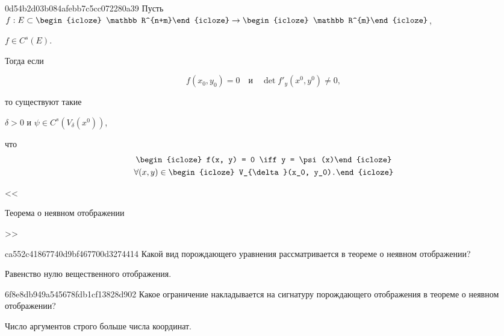\begin{note}{0d54b2d03b084afebb7c5cc072280a39}
    Пусть \({ f : E \subset \begin{icloze}{4}\mathbb R^{n+m}\end{icloze} \to \begin{icloze}{4}\mathbb R^{m}\end{icloze} }\), \begin{icloze}{5}\({ f \in C^{s}(E) }\).\end{icloze}
    Тогда если
    \begin{icloze}{1}
        \[
            f(x_{0}, y_{0}) = 0 \quad \text{и} \quad \det f'_{y}(x^{0}, y^{0}) \neq 0,
        \]
    \end{icloze}
    то существуют такие \begin{icloze}{2}\({ \delta > 0 }\) и \({ \psi \in C^{s}(V_{\delta}(x^0)) }\),\end{icloze} что
    \[
        \begin{gathered}
            \begin{icloze}{3}f(x, y) = 0 \iff y = \psi(x)\end{icloze} \\
            \forall (x, y) \in \begin{icloze}{6}V_{\delta}(x_0, y_0).\end{icloze}
        \end{gathered}
    \]

    \begin{center}
        \tiny
        <<\begin{icloze}{7}Теорема о неявном отображении\end{icloze}>>
    \end{center}
\end{note}

\begin{note}{ca552c41867740d9bf467700d3274414}
    Какой вид порождающего уравнения рассматривается в теореме о неявном отображении?

    \begin{cloze}{1}
        Равенство нулю вещественного отображения.
    \end{cloze}
\end{note}

\begin{note}{6f8e8db949a545678fdb1cf13828d902}
    Какое ограничение накладывается на сигнатуру порождающего отображения в теореме о неявном отображении?

    \begin{cloze}{1}
        Число аргументов строго больше числа координат.
    \end{cloze}
\end{note}


